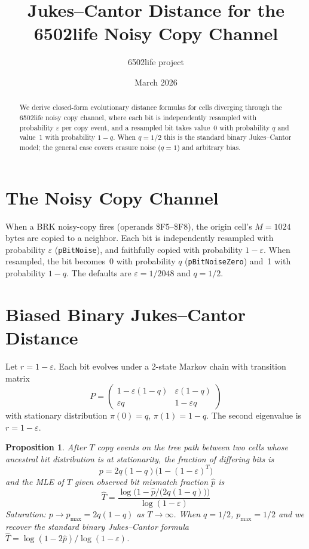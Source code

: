 \documentclass[11pt]{article}
\title{Jukes--Cantor Distance for the 6502life Noisy Copy Channel}
\author{6502life project}
\date{March 2026}
\newtheorem{proposition}{Proposition}
\begin{document}
\maketitle

\begin{abstract}
We derive closed-form evolutionary distance formulas for cells diverging
through the 6502life noisy copy channel, where each bit is independently
resampled with probability $\varepsilon$ per copy event, and a resampled
bit takes value~0 with probability $q$ and value~1 with probability
$1-q$.  When $q = 1/2$ this is the standard binary Jukes--Cantor model;
the general case covers erasure noise ($q=1$) and arbitrary bias.
\end{abstract}

\section{The Noisy Copy Channel}

When a BRK noisy-copy fires (operands \$F5--\$F8), the origin cell's
$M = 1024$ bytes are copied to a neighbor. Each bit is independently
resampled with probability $\varepsilon$ (\texttt{pBitNoise}), and
faithfully copied with probability $1-\varepsilon$. When resampled,
the bit becomes~0 with probability $q$ (\texttt{pBitNoiseZero}) and~1
with probability $1-q$. The defaults are $\varepsilon = 1/2048$ and
$q = 1/2$.

\section{Biased Binary Jukes--Cantor Distance}

Let $r = 1-\varepsilon$. Each bit evolves under a 2-state Markov chain
with transition matrix
\[
P = \begin{pmatrix} 1-\varepsilon(1-q) & \varepsilon(1-q) \\
                     \varepsilon q & 1-\varepsilon q
    \end{pmatrix}
\]
with stationary distribution $\pi(0) = q$, $\pi(1) = 1-q$.
The second eigenvalue is $r = 1-\varepsilon$.

\begin{proposition}
After $T$ copy events on the tree path between two cells whose ancestral
bit distribution is at stationarity, the fraction of differing bits is
\begin{equation}
p = 2q(1-q)\bigl(1 - (1-\varepsilon)^T\bigr)
\end{equation}
and the MLE of $T$ given observed bit mismatch fraction $\hat{p}$ is
\begin{equation}
\boxed{\hat{T} = \frac{\log\bigl(1 - \hat{p}/\bigl(2q(1-q)\bigr)\bigr)}{\log(1 - \varepsilon)}}
\end{equation}
Saturation: $p \to p_{\max} = 2q(1-q)$ as $T \to \infty$.
When $q = 1/2$, $p_{\max} = 1/2$ and we recover the standard binary
Jukes--Cantor formula $\hat{T} = \log(1-2\hat{p})/\log(1-\varepsilon)$.
\end{proposition}
\end{document}
